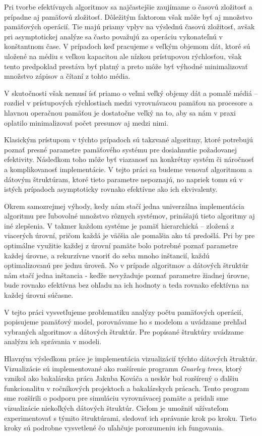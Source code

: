 
Pri tvorbe efektívnych algoritmov sa najčastejšie zaujímame o časovú zložitosť a prípadne aj pamäťovú zložitosť. Dôležitým faktorom však môže byť aj množstvo pamäťových operácií. Tie majú priamy vplyv na výslednú časovú zložitosť, avšak pri asymptotickej analýze sa často považujú za operáciu vykonateľnú v konštantnom čase. V prípadoch keď pracujeme s veľkým objemom dát, ktoré sú uložené na médiu s veľkou kapacitou ale nízkou prístupovou rýchlosťou, však tento predpoklad prestáva byť platný a preto môže byť výhodné minimalizovať množstvo zápisov a čítaní z tohto média. 

V skutočnosti však nemusí ísť priamo o veľmi veľký objemy dát a pomalé médiá -- rozdiel v prístupových rýchlostiach medzi vyrovnávacou pamäťou na procesore a hlavnou operačnou pamäťou je dostatočne veľký na to, aby sa nám v praxi oplatilo minimalizovať počet presunov aj medzi nimi.

Klasickým prístupom v týchto prípadoch sú takzvané \aware algoritmy, ktoré potrebujú poznať presné parametre pamäťového systému pre dosiahnutie požadovanej efektivity. Následkom toho môže byť viazanosť na konkrétny systém či náročnosť a komplikovanosť implementácie. V tejto práci sa budeme venovať \obliv algoritmom a dátovým štruktúram, ktoré tieto parametre nepoznajú, no napriek tomu sú v istých prípadoch asymptoticky rovnako efektívne ako ich \aware ekvivalenty.

Okrem samozrejmej výhody, kedy nám stačí jedna univerzálna implementácia algoritmu pre ľubovolné množstvo rôznych systémov, prinášajú tieto algoritmy aj iné zlepšenia. V takmer každom systéme je pamäť hierarchická -- zložená z viacerých úrovní, pričom každá je väčšia ale pomalšia ako tá predošlá. Pri \aware by pre optimálne využitie každej z úrovní pamäte bolo potrebné poznať parametre každej úrovne, a rekurzívne vnoriť do seba mnoho inštancií, každú optimalizovanú pre jednu úroveň. No v prípade \obliv algoritmov a dátových štruktúr nám stačí jedna inštancia - keďže nevyžaduje poznať parametre žiadnej úrovne, bude rovnako efektívna bez ohľadu na ich hodnoty a teda rovnako efektívna na každej úrovni súčasne.

V tejto práci vysvetľujeme problematiku analýzy počtu pamäťových operácií, popisujeme \obliv pamäťový model, porovnávame ho s \aware modelom a uvádzame prehľad vybraných algoritmov a dátových štruktúr. Pre popísané štruktúry uvádzame analýzu ich správania v \obliv modeli.

Hlavným výsledkom práce je implementácia vizualizácií týchto dátových štruktúr. Vizualizácie sú implementované ako rozšírenie programu {\em Gnarley trees}, ktorý vznikol ako bakalárska práca Jakuba Kováča a neskôr bol rozšírený o ďalšiu funkcionalitu v ročníkových projektoch a bakalárskych prácach. Tento program sme rozšírili o podporu pre simuláciu vyrovnávacej pamäte a pridali sme vizualizácie niekoľkých \obliv dátových štruktúr. Cieľom je umožniť užívateľom experimentovať s týmito štruktúrami, sledovať ich správanie krok po kroku. Tieto kroky sú podrobne vysvetlené čo uľahčuje porozumeniu ich fungovania. 